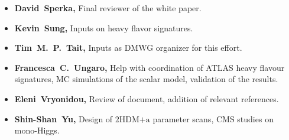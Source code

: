 \documentclass[a4paper, 11pt,notoc]{article}
\newcommand{\hdma}{\ensuremath{\textrm{2HDM+a}}\xspace}
\begin{document}
\begin{itemize}
\item \textbf{David~Sperka,}  Final reviewer of the white paper. 

\item \textbf{Kevin~Sung,} Inputs on heavy flavor signatures. 

\item \textbf{Tim~M.~P.~Tait,} Inputs as DMWG organizer for this effort. 

\item \textbf{Francesca~C.~Ungaro,} Help with coordination of ATLAS heavy flavour signatures, MC simulations of the scalar model, validation of the results. 

\item \textbf{Eleni~Vryonidou,} Review of document, addition of relevant references.

\item \textbf{Shin-Shan~Yu,} Design of \hdma parameter scans, CMS studies on mono-Higgs.

\end{itemize}
\end{document}
